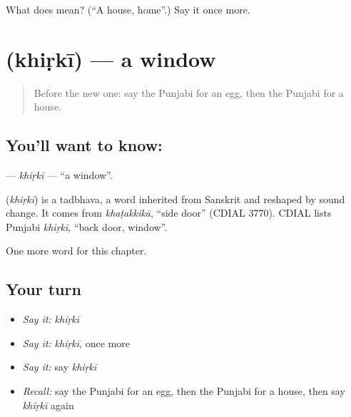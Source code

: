 \begin{tcolorbox}[breakable,colback=teal!4,colframe=teal!35!black,title={Before you move on}]
What does  mean? (\textquotedblleft{}A house, home\textquotedblright{}.) Say it once more.
\end{tcolorbox}
\section[\texorpdfstring{\pa{ਖਿੜਕੀ} (khiṛkī)}{ਖਿੜਕੀ (khiṛkī)}]{ (khiṛkī) — a window}

\label{lesson:PA-C67-khirki}



\begin{quote}
Before the new one: say the Punjabi for an egg, then the Punjabi for a house.
\end{quote}

\subsection*{You'll want to know: }
\textbf{} — \emph{khiṛkī} — \textquotedblleft{}a window\textquotedblright{}.

\begin{cousinweb}
\textbf{} (\emph{khiṛkī}) is a tadbhava, a word inherited from Sanskrit and reshaped by sound change. It comes from \emph{khaṭakkikā}, \textquotedblleft{}side door\textquotedblright{} (CDIAL 3770). CDIAL lists Punjabi \emph{khiṛkī}, \textquotedblleft{}back door, window\textquotedblright{}.
\end{cousinweb}

\begin{grammarlens}[title={What you've built}]
One more word for this chapter.
\end{grammarlens}

\subsection*{Your turn}
\begin{itemize}
\raggedright
  \item \emph{Say it:} \emph{khiṛkī}
  \item \emph{Say it:} \emph{khiṛkī}, once more
  \item \emph{Say it:} say \emph{khiṛkī}
  \item \emph{Recall:} say the Punjabi for an egg, then the Punjabi for a house, then say \emph{khiṛkī} again
\end{itemize}

